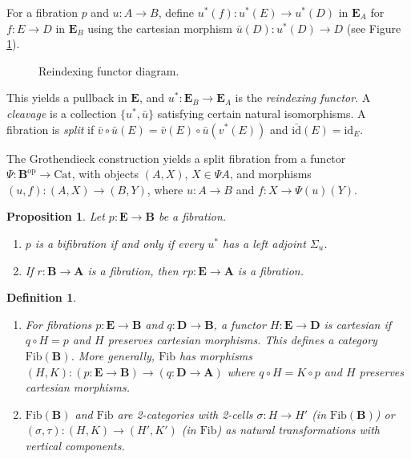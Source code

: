 \documentclass{article}
\theoremstyle{plain}
\newtheorem{proposition}[theorem]{Proposition}
\newtheorem{definition}[theorem]{Definition}
\theoremstyle{remark}
\begin{document}
For a fibration $p$ and $u : A \to B$, define $u^*(f) : u^*(E) \to u^*(D)$ in $\mathbf{E}_A$ for $f : E \to D$ in $\mathbf{E}_B$ using the cartesian morphism $\bar{u}(D) : u^*(D) \to D$ (see Figure \ref{fig:reindexing}).
\begin{figure}[h]
    \centering
    \caption{Reindexing functor diagram.}
    \label{fig:reindexing}
\end{figure}
This yields a pullback in $\mathbf{E}$, and $u^* : \mathbf{E}_B \to \mathbf{E}_A$ is the \emph{reindexing functor}. A \emph{cleavage} is a collection $\{ u^*, \bar{u} \}$ satisfying certain natural isomorphisms. A fibration is \emph{split} if $\bar{v} \circ \bar{u}(E) = \bar{v}(E) \circ \bar{u}(v^*(E))$ and $\bar{\text{id}}(E) = \text{id}_E$.

The Grothendieck construction yields a split fibration from a functor $\Psi : \mathbf{B}^{\text{op}} \to \text{Cat}$, with objects $(A, X)$, $X \in \Psi A$, and morphisms $(u, f) : (A, X) \to (B, Y)$, where $u : A \to B$ and $f : X \to \Psi(u)(Y)$.

\begin{proposition}
\label{prop:2.3}
Let $p : \mathbf{E} \to \mathbf{B}$ be a fibration.
\begin{enumerate}
    \item[(i)] $p$ is a bifibration if and only if every $u^*$ has a left adjoint $\Sigma_u$.
    \item[(ii)] If $r : \mathbf{B} \to \mathbf{A}$ is a fibration, then $r p : \mathbf{E} \to \mathbf{A}$ is a fibration.
\end{enumerate}
\end{proposition}

\begin{definition}
\label{def:2.4}
\begin{enumerate}
    \item[(i)] For fibrations $p : \mathbf{E} \to \mathbf{B}$ and $q : \mathbf{D} \to \mathbf{B}$, a functor $H : \mathbf{E} \to \mathbf{D}$ is \emph{cartesian} if $q \circ H = p$ and $H$ preserves cartesian morphisms. This defines a category $\text{Fib}(\mathbf{B})$. More generally, $\text{Fib}$ has morphisms $(H, K) : (p : \mathbf{E} \to \mathbf{B}) \to (q : \mathbf{D} \to \mathbf{A})$ where $q \circ H = K \circ p$ and $H$ preserves cartesian morphisms.
    \item[(ii)] $\text{Fib}(\mathbf{B})$ and $\text{Fib}$ are 2-categories with 2-cells $\sigma : H \to H'$ (in $\text{Fib}(\mathbf{B})$) or $(\sigma, \tau) : (H, K) \to (H', K')$ (in $\text{Fib}$) as natural transformations with vertical components.
\end{enumerate}
\end{definition}
\end{document}
